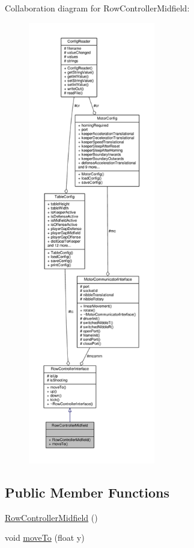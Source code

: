 Collaboration diagram for Row\+Controller\+Midfield\+:\nopagebreak
\begin{figure}[H]
\begin{center}
\leavevmode
\includegraphics[height=550pt]{class_row_controller_midfield__coll__graph}
\end{center}
\end{figure}
\subsection*{Public Member Functions}
\begin{DoxyCompactItemize}
\item 
\hyperlink{class_row_controller_midfield_a7e210d9b542931d5755c2819b23ad7d9}{Row\+Controller\+Midfield} ()
\item 
void \hyperlink{class_row_controller_midfield_abb18143035197d88503063f747aa1d2a}{move\+To} (float y)
\end{DoxyCompactItemize}
